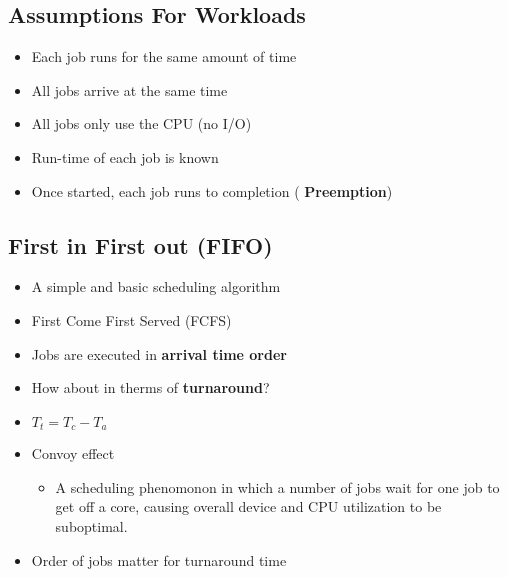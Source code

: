 \documentclass[a4paper,11pt,english]{article}
\begin{document}
\subsection*{Assumptions For Workloads}
\begin{itemize}
    \item Each job runs for the same amount of time
    \item All jobs arrive at the same time
    \item All jobs only use the CPU (no I/O)
    \item Run-time of each job is known
    \item Once started, each job runs to completion (\textbf{\color{blue} Preemption})
\end{itemize}

\subsection*{First in First out (FIFO)}
\begin{itemize}
    \item A simple and basic scheduling algorithm
    \item First Come First Served (FCFS)
    \item Jobs are executed in \textbf{\color{blue} arrival time order}
    \item How about in therms of \textbf{\color{blue} turnaround}?
    \item $T_t = T_c - T_a$
    \item Convoy effect
        \begin{itemize}
            \item A scheduling phenomonon in which a number of jobs wait for one job to get off a core, causing overall device and CPU utilization to be suboptimal. 
        \end{itemize}
    \item Order of jobs matter for turnaround time
\end{itemize}
\end{document}
